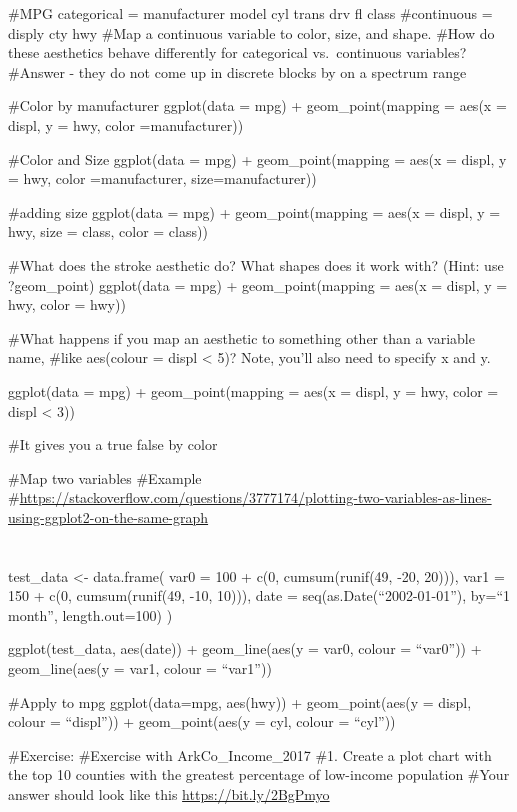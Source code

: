 \documentclass[]{book}
\begin{document}
\#MPG categorical = manufacturer model cyl trans drv fl class
\#continuous = disply cty hwy
\#Map a continuous variable to color, size, and shape.
\#How do these aesthetics behave differently for categorical vs.~continuous variables?
\#Answer - they do not come up in discrete blocks by on a spectrum range

\#Color by manufacturer
ggplot(data = mpg) +
geom\_point(mapping = aes(x = displ, y = hwy, color =manufacturer))

\#Color and Size
ggplot(data = mpg) +
geom\_point(mapping = aes(x = displ, y = hwy, color =manufacturer, size=manufacturer))

\#adding size
ggplot(data = mpg) +
geom\_point(mapping = aes(x = displ, y = hwy, size = class, color = class))

\#What does the stroke aesthetic do? What shapes does it work with? (Hint: use ?geom\_point)
ggplot(data = mpg) +
geom\_point(mapping = aes(x = displ, y = hwy, color = hwy))

\#What happens if you map an aesthetic to something other than a variable name,
\#like aes(colour = displ \textless{} 5)? Note, you'll also need to specify x and y.

ggplot(data = mpg) +
geom\_point(mapping = aes(x = displ, y = hwy, color = displ \textless{} 3))

\#It gives you a true false by color

\#Map two variables
\#Example
\#\url{https://stackoverflow.com/questions/3777174/plotting-two-variables-as-lines-using-ggplot2-on-the-same-graph}

\hypertarget{section}{%
\chapter{}\label{section}}

test\_data \textless{}-
data.frame(
var0 = 100 + c(0, cumsum(runif(49, -20, 20))),
var1 = 150 + c(0, cumsum(runif(49, -10, 10))),
date = seq(as.Date(``2002-01-01''), by=``1 month'', length.out=100)
)

ggplot(test\_data, aes(date)) +
geom\_line(aes(y = var0, colour = ``var0'')) +
geom\_line(aes(y = var1, colour = ``var1''))

\#Apply to mpg
ggplot(data=mpg, aes(hwy)) +
geom\_point(aes(y = displ, colour = ``displ'')) +
geom\_point(aes(y = cyl, colour = ``cyl''))

\#Exercise:
\#Exercise with ArkCo\_Income\_2017
\#1. Create a plot chart with the top 10 counties with the greatest percentage of low-income population
\#Your answer should look like this
\url{https://bit.ly/2BgPmyo}
\end{document}
